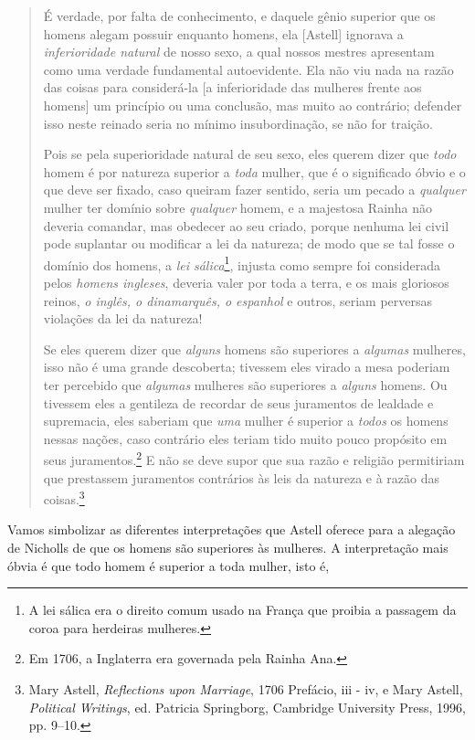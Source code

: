 \begin{quotation}
\noindent É verdade, por falta de conhecimento, e daquele gênio superior que os homens alegam possuir enquanto homens, ela [Astell] ignorava a \emph{inferioridade natural} de nosso sexo, a qual nossos mestres apresentam como uma verdade fundamental autoevidente.
Ela não viu nada na razão das coisas para considerá-la [a inferioridade das mulheres frente aos homens] um princípio ou uma conclusão, mas muito ao contrário; defender isso neste reinado seria no mínimo insubordinação, se não for traição.

Pois se pela superioridade natural de seu sexo, eles querem dizer que \textit{todo} homem é por natureza superior a \textit{toda} mulher, que é o significado óbvio e o que deve ser fixado, caso queiram fazer sentido, seria um pecado a \textit{qualquer} mulher ter domínio sobre \textit{qualquer} homem, e a majestosa Rainha não deveria comandar, mas obedecer ao seu criado, porque nenhuma lei civil pode suplantar ou modificar a lei da natureza; de modo que se tal fosse o domínio dos homens, a \emph{lei sálica}\footnote{
	A lei sálica era o direito comum usado na França que proibia a passagem da coroa para herdeiras mulheres.}, injusta como sempre foi considerada pelos \emph{homens ingleses}, deveria valer por toda a terra, e os mais gloriosos reinos, \emph{o inglês, o dinamarquês, o espanhol} e outros, seriam perversas violações da lei da natureza!

Se eles querem dizer que \textit{alguns} homens são superiores a \textit{algumas} mulheres, isso não é uma grande descoberta; tivessem eles virado a mesa poderiam ter percebido que \textit{algumas} mulheres são superiores a \textit{alguns} homens.
Ou tivessem eles a gentileza de recordar de seus juramentos de lealdade e supremacia, eles saberiam que \textit{uma} mulher é superior a \textit{todos} os homens nessas nações, caso contrário eles teriam tido muito pouco propósito em seus juramentos.\footnote{
	Em 1706, a Inglaterra era governada pela Rainha Ana.}
E não se deve supor que sua razão e religião permitiriam que prestassem juramentos contrários às leis da natureza e à razão das coisas.\footnote{
	Mary Astell, \textit{Reflections upon Marriage}, 1706 Prefácio, iii - iv, e Mary Astell, \textit{Political Writings}, ed. Patricia Springborg, Cambridge University Press, 1996, pp. 9--10.}
\end{quotation}
Vamos simbolizar as diferentes interpretações que Astell oferece para a alegação de Nicholls de que os homens são superiores às mulheres.
A interpretação mais óbvia é que todo homem é superior a toda mulher, isto é,
